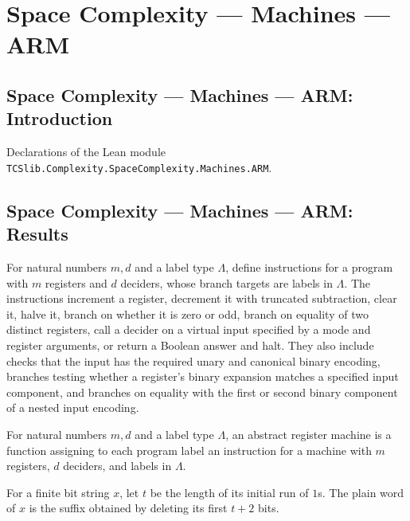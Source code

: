 \section{Space Complexity --- Machines --- ARM}
\subsection*{Space Complexity --- Machines --- ARM: Introduction}

Declarations of the Lean module \texttt{TCSlib.Complexity.SpaceComplexity.Machines.ARM}.

\subsection*{Space Complexity --- Machines --- ARM: Results}

\begin{definition}
\label{Complexity.LogProg.Ins}
\leanok
{}
For natural numbers $m,d$ and a label type $\Lambda$, define instructions for a program
with $m$ registers and $d$ deciders, whose branch targets are labels in $\Lambda$. The
instructions increment a register, decrement it with truncated subtraction, clear it,
halve it, branch on whether it is zero or odd, branch on equality of two distinct
registers, call a decider on a virtual input specified by a mode and register arguments,
or return a Boolean answer and halt. They also include checks that the input has the
required unary and canonical binary encoding, branches testing whether a register's
binary expansion matches a specified input component, and branches on equality with the
first or second binary component of a nested input encoding.
\end{definition}

\begin{definition}
\label{Complexity.LogProg.ARM}
\leanok
{}
For natural numbers $m,d$ and a label type $\Lambda$, an abstract register machine is a
function assigning to each program label an instruction for a machine with $m$
registers, $d$ deciders, and labels in $\Lambda$.
\end{definition}

\begin{definition}
\label{Complexity.LogProg.plainWord}
\leanok
{}
For a finite bit string $x$, let $t$ be the length of its initial run of $1$s. The plain
word of $x$ is the suffix obtained by deleting its first $t+2$ bits.
\end{definition}

